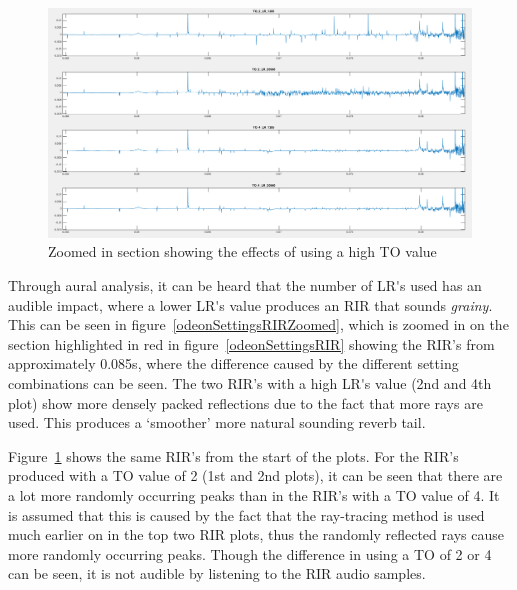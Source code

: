 \documentclass[../../main.tex]{subfiles}
\begin{document}
			\begin{figure}[h]
				\centerline{\includegraphics[scale = 0.35]{Sections/Implementation/Odeon/images/OdeonSettings/settingsFigure_TOZoom.png}}
				\caption{Zoomed in section showing the effects of using a high \ac{TO} value}
				\label{odeonSettings_TOZoomed}
			\end{figure}

				Through aural analysis, it can be heard that the number of \ac{LR's} used has an audible impact, where a lower \ac{LR's} value produces an \ac{RIR} that sounds \textit{grainy}. This can be seen in figure~\ref{odeonSettingsRIRZoomed}, which is zoomed in on the section highlighted in red in figure~\ref{odeonSettingsRIR} showing the \ac{RIR}'s from approximately 0.085s, where the difference caused by the different setting combinations can be seen. The two \ac{RIR}'s with a high \ac{LR's} value (2nd and 4th plot) show more densely packed reflections due to the fact that more rays are used. This produces a `smoother' more natural sounding reverb tail.


				Figure~\ref{odeonSettings_TOZoomed} shows the same \ac{RIR}'s from the start of the plots. For the \ac{RIR}'s produced with a \ac{TO} value of 2 (1st and 2nd plots), it can be seen that there are a lot more randomly occurring peaks than in the \ac{RIR}'s with a \ac{TO} value of 4. It is assumed that this is caused by the fact that the ray-tracing method is used much earlier on in the top two \ac{RIR} plots, thus the randomly reflected rays cause more randomly occurring peaks. Though the difference in using a \ac{TO} of 2 or 4 can be seen, it is not audible by listening to the \ac{RIR} audio samples.
\end{document}
